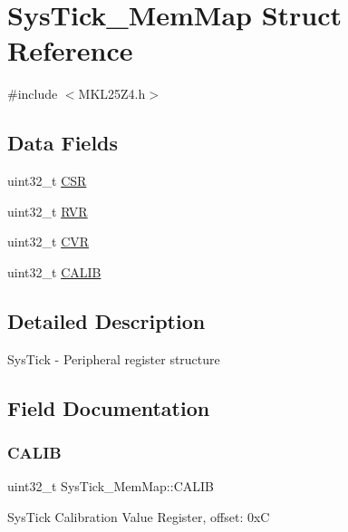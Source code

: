 \hypertarget{struct_sys_tick___mem_map}{}\section{Sys\+Tick\+\_\+\+Mem\+Map Struct Reference}
\label{struct_sys_tick___mem_map}


{\ttfamily \#include $<$M\+K\+L25\+Z4.\+h$>$}

\subsection*{Data Fields}
\begin{DoxyCompactItemize}
\item 
uint32\+\_\+t \hyperlink{struct_sys_tick___mem_map_aec23689880afd46876916055403e867a}{C\+SR}
\item 
uint32\+\_\+t \hyperlink{struct_sys_tick___mem_map_a3f2018b492fd4bc1d141a718d499e50f}{R\+VR}
\item 
uint32\+\_\+t \hyperlink{struct_sys_tick___mem_map_a508dd628bc347f199e7baf4b1bfbfa0d}{C\+VR}
\item 
uint32\+\_\+t \hyperlink{struct_sys_tick___mem_map_a9e83c524401ad455c84d5a9738ca3d4d}{C\+A\+L\+IB}
\end{DoxyCompactItemize}


\subsection{Detailed Description}
Sys\+Tick -\/ Peripheral register structure 

\subsection{Field Documentation}
\mbox{\label{struct_sys_tick___mem_map_a9e83c524401ad455c84d5a9738ca3d4d}} 
\subsubsection{\texorpdfstring{C\+A\+L\+IB}{CALIB}}
{\footnotesize\ttfamily uint32\+\_\+t Sys\+Tick\+\_\+\+Mem\+Map\+::\+C\+A\+L\+IB}

Sys\+Tick Calibration Value Register, offset\+: 0xC \mbox{\label{struct_sys_tick___mem_map_aec23689880afd46876916055403e867a}} 
